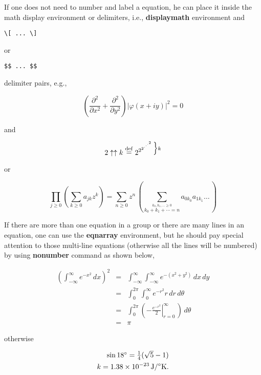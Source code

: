If one does not need to number and label a equation, he can place it
inside the math display environment or delimiters, i.e., \textbf{displaymath}
environment and
\begin{verbatim}
\[ ... \]
\end{verbatim}
or
\begin{verbatim}
$$ ... $$
\end{verbatim}
delimiter pairs, e.g.,

$$
\left(\frac{\partial^2}{\partial x^2}+
\frac{\partial^2}{\partial y^2}\right)\left|\varphi(x+iy)\right|^2 = 0
$$

and

\begin{displaymath}
    2\uparrow\uparrow k\mathrel{\mathop=^{\rm def}}
    2^{2^{2^{\cdot^{\cdot^{\cdot^2}}}}}
    \vbox{\hbox{$\Bigr\}\scriptstyle k$}\kern0pt}
\end{displaymath}

or

\[
\prod_{j\ge0}\left(\sum_{k\ge0}a_{jk}z^k\right)
   =\sum_{n\ge0}z^n\,\left(\sum_
    {\stackrel{\scriptstyle k_0,k_1,\ldots\ge0}
    {\scriptstyle k_0+k_1+\cdots=n}}
    a_{0k_0}a_{1k_1}\ldots\,\right)
\]

If there are more than one  equation in a group or there are many lines
in an equation, one can use the \textbf{eqnarray} environment, but he should
pay special attention to those multi-line equations (otherwise all the lines
will be numbered) by using \textbf{nonumber} command  as shown below,

\begin{eqnarray}
 \left(\int_{-\infty}^\infty e^{-x^2}\,dx\right)^2
 & =& \int_{-\infty}^\infty\int_{-\infty}^\infty
   e^{-(x^2+y^2)}\,dx\,dy \nonumber \\
 & =& \int_0^{2\pi}\int_0^\infty e^{-r^2}r\,dr\,d\theta \nonumber \\
 & =& \int_0^{2\pi}\left(\left. -\frac{e^{-r^2}}{2}
   \right|_{r=0}^{\infty}\,\right)\,d\theta \nonumber \\
 & =& \pi
\end{eqnarray}

otherwise

\begin{eqnarray}
\textstyle\sin18^\circ={\frac{1}{4}}(\sqrt5-1)\\
k=1.38\times10^{-23}\rm\,J/^\circ K.
\end{eqnarray}

